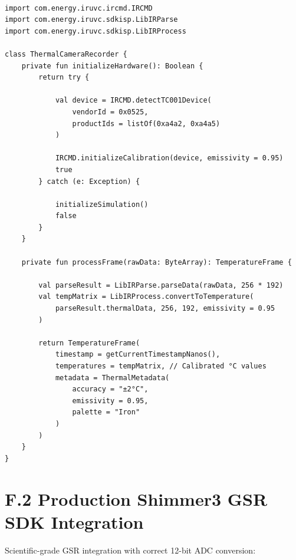 \begin{verbatim}

import com.energy.iruvc.ircmd.IRCMD
import com.energy.iruvc.sdkisp.LibIRParse
import com.energy.iruvc.sdkisp.LibIRProcess

class ThermalCameraRecorder {
    private fun initializeHardware(): Boolean {
        return try {

            val device = IRCMD.detectTC001Device(
                vendorId = 0x0525,
                productIds = listOf(0xa4a2, 0xa4a5)
            )

            IRCMD.initializeCalibration(device, emissivity = 0.95)
            true
        } catch (e: Exception) {

            initializeSimulation()
            false
        }
    }

    private fun processFrame(rawData: ByteArray): TemperatureFrame {

        val parseResult = LibIRParse.parseData(rawData, 256 * 192)
        val tempMatrix = LibIRProcess.convertToTemperature(
            parseResult.thermalData, 256, 192, emissivity = 0.95
        )

        return TemperatureFrame(
            timestamp = getCurrentTimestampNanos(),
            temperatures = tempMatrix, // Calibrated °C values
            metadata = ThermalMetadata(
                accuracy = "±2°C",
                emissivity = 0.95,
                palette = "Iron"
            )
        )
    }
}
\end{verbatim}

\section{F.2 Production Shimmer3 GSR SDK Integration}

Scientific-grade GSR integration with correct 12-bit ADC conversion:

